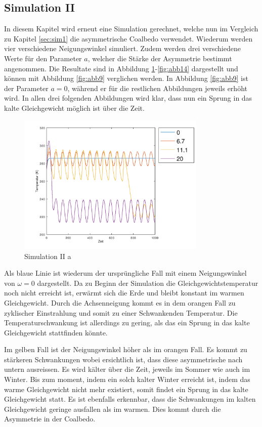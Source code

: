 \begin{refsection}
\subsection{Simulation II} \label{sim2} 
In diesem Kapitel wird erneut eine Simulation gerechnet, welche nun im Vergleich zu Kapitel \ref{sec:sim1} die asymmetrische Coalbedo verwendet. Wiederum werden vier verschiedene Neigungswinkel simuliert. Zudem werden drei verschiedene Werte für den Parameter $a$, welcher die Stärke der Asymmetrie bestimmt angenommen. Die Resultate sind in Abbildung \ref{fig:abb12}-\ref{fig:abb14} dargestellt und können mit Abbildung \ref{fig:abb9} verglichen werden. In Abbildung \ref{fig:abb9} ist der Parameter $a=0$, während er für die restlichen Abbildungen jeweils erhöht wird. In allen drei folgenden Abbildungen wird klar, dass nun ein Sprung in das kalte Gleichgewicht möglich ist über die Zeit. 
%
\begin{figure}
	\centering
	\includegraphics[width= 0.8\textwidth]{neigung/Zeitachse_1.png}
	\caption[Simulation II a]{Simulation II a}
	\label{fig:abb12}
\end{figure}
%
Als blaue Linie ist wiederum der ursprüngliche Fall mit einem Neigungswinkel von $\omega=0$ dargestellt. Da zu Beginn der Simulation die Gleichgewichtstemperatur noch nicht erreicht ist, erwärmt sich die Erde und bleibt konstant im warmen Gleichgewicht. Durch die Achsenneigung kommt es in dem orangen Fall zu zyklischer Einstrahlung und somit zu einer Schwankenden Temperatur. Die Temperaturschwankung ist allerdings zu gering, als das ein Sprung in das kalte Gleichgewicht stattfinden könnte. 

Im gelben Fall ist der Neigungswinkel höher als im orangen Fall. Es kommt zu stärkeren Schwankungen wobei ersichtlich ist, dass diese asymmetrische nach untern ausreissen. Es wird kälter über die  Zeit, jeweils im Sommer wie auch im Winter. Bis zum moment, indem ein solch kalter Winter erreicht ist, indem das warme Gleichgewicht nicht mehr existiert, somit findet ein Sprung in das kalte Gleichgewicht statt. Es ist ebenfalls erkennbar, dass die Schwankungen im kalten Gleichgewicht geringe ausfallen als im warmen. Dies kommt durch die Asymmetrie in der Coalbedo.


\end{refsection}
